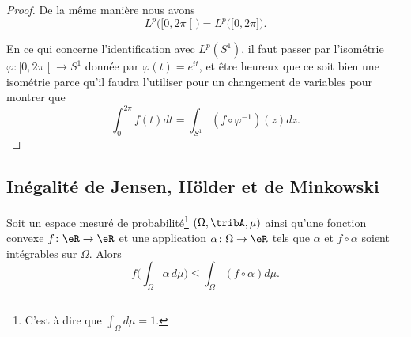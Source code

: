 \begin{proof}
    De la même manière nous avons
    \begin{equation}
        L^p\big( \mathopen[ 0 , 2\pi \mathclose[ \big)=L^p\big( \mathopen[ 0 , 2\pi \mathclose] \big).
    \end{equation}
    
    En ce qui concerne l'identification avec \( L^p(S^1)\), il faut passer par l'isométrie \( \varphi\colon \mathopen[ 0 , 2\pi \mathclose[\to S^1\) donnée par \( \varphi(t)= e^{it}\), et être heureux que ce soit bien une isométrie parce qu'il faudra l'utiliser pour un changement de variables pour montrer que
        \begin{equation}
            \int_0^{2\pi}f(t)dt=\int_{S^1}(f\circ\varphi^{-1})(z)dz.
        \end{equation}
\end{proof}

\subsection{Inégalité de Jensen, Hölder et de Minkowski}

\begin{proposition} \label{PropXISooBxdaLk}
    Soit un espace mesuré de probabilité\footnote{C'est à dire que \( \int_{\Omega}d\mu=1\).} \( (\Omega,\tribA,\mu)\) ainsi qu'une fonction convexe \( f\colon \eR\to \eR\) et une application \( \alpha\colon \Omega\to \eR\) tels que \( \alpha\) et \( f\circ \alpha\) soient intégrables sur \( \Omega\). Alors
    \begin{equation}
        f\Big( \int_{\Omega}\alpha\,d\mu \Big)\leq \int_{\Omega}(f\circ\alpha) d\mu.
    \end{equation}
\end{proposition}


